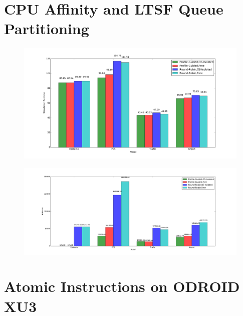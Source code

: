 \documentclass[11pt]{book}
\begin{document}
\section{CPU Affinity and LTSF Queue Partitioning}

\begin{figure}
    \centering
    \includegraphics[width=\textwidth,keepaspectratio,quiet]{figs/big_little/os_partitioning_times.pdf}
\end{figure}

\begin{figure}
    \centering
    \includegraphics[width=\textwidth,keepaspectratio,quiet]{figs/big_little/os_partitioning_rbs.pdf}
\end{figure}

\section{Atomic Instructions on ODROID XU3}
\end{document}
